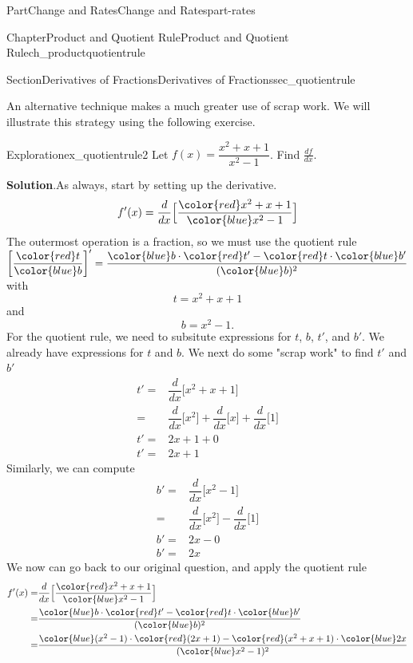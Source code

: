 \documentclass[oneside,10pt,]{tufte-book}
\newcommand{\blocktitlefont}{\relax}
\numberwithin{equation}{chapter}
\newcommand{\red}[1]{   {\color{red}   #1}   }
\newcommand{\blue}[1]{  {\color{blue}  #1}  }
\newcommand{\ddx}[1]{ \dfrac{d}{dx} \Big[ #1 \Big]  }
\newcommand{\amp}{&}
\begin{document}
\begin{partptx}{Part}{Change and Rates}{}{Change and Rates}{}{}{part-rates}
\begin{chapterptx}{Chapter}{Product and Quotient Rule}{}{Product and Quotient Rule}{}{}{ch_productquotientrule}
\begin{sectionptx}{Section}{Derivatives of Fractions}{}{Derivatives of Fractions}{}{}{sec_quotientrule}
\par
An alternative technique makes a much greater use of scrap work.  We will illustrate this strategy using the following exercise.%
\begin{exploration}{Exploration}{}{ex_quotientrule2}%
Let \(f(x) = \dfrac{x^2 + x + 1}{x^2 -1 }\). Find \(\frac{df}{dx}\).%
\par\smallskip%
\noindent\textbf{\blocktitlefont Solution}.\hypertarget{ex_quotientrule2-2}{}\quad{}As always,  start by setting up the derivative.%
\begin{equation*}
f'(x) = \ddx{ \dfrac{ \red{x^2 + x + 1} }{ \blue{x^2 -1} } }
\end{equation*}
The outermost operation is a fraction, so we must use the quotient rule \(\left[\dfrac{\red{t}}{\blue{b}}\right]' = \dfrac{\blue{b}\cdot \red{t'} - \red{t}\cdot \blue{b'}}{(\blue{b})^2}\) with%
\begin{equation*}
t = x^2 + x + 1
\end{equation*}
and%
\begin{equation*}
b = x^2 - 1\text{.}
\end{equation*}
For the quotient rule, we need to subsitute expressions for \(t\), \(b\), \(t'\), and \(b'\). We already have expressions for \(t\) and \(b\).  We next do some "scrap work" to find \(t'\) and \(b'\)%
\begin{align*}
t' = \amp \ddx{x^2 + x + 1} \\
= \amp \ddx{x^2} + \ddx{x} + \ddx{1}\\
t'= \amp 2x+1+ 0\\
t'= \amp 2x+1
\end{align*}
Similarly, we can compute%
\begin{align*}
b' = \amp \ddx{x^2 - 1} \\
= \amp \ddx{x^2} - \ddx{1}\\
b'= \amp 2x - 0\\
b'= \amp 2x
\end{align*}
We now can go back to our original question, and apply the quotient rule%
\begin{align*}
f'(x) = \amp \ddx{ \dfrac{ \red{x^2 + x + 1} }{ \blue{x^2 -1} } }\\
=  \amp \dfrac{\blue{b}\cdot \red{t'} - \red{t}\cdot \blue{b'}}{(\blue{b})^2}\\
= \amp \dfrac{\blue{(x^2 - 1)}\cdot \red{(2x+1)} - \red{(x^2 + x + 1)}\cdot \blue{2x}}{(\blue{x^2 - 1})^2} 
\end{align*}
%
\end{exploration}%

\end{sectionptx}
\end{chapterptx}
\end{partptx}
\end{document}
